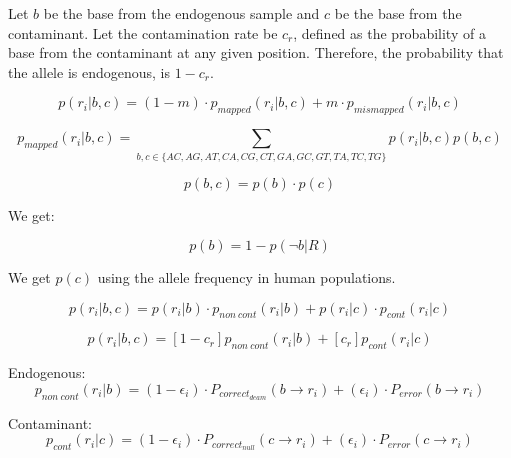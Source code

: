 \documentclass[a4paper,12pt]{article}
\begin{document}
Let $b$ be the base from the endogenous sample and $c$ be the base from the contaminant. Let the contamination rate be $c_r$, defined as the probability of a base from the contaminant at any given position. Therefore, the probability that the allele is endogenous, is $1-c_r$.

\begin{equation}
p(r_i|b,c)  = (1-m) \cdot p_{mapped}(r_i|b,c) + m \cdot p_{mismapped}(r_i|b,c)  %
\end{equation}


\begin{equation}
p_{mapped}(r_i|b,c) = \sum\limits_{ b,c \in \{AC,AG,AT,CA,CG,CT,GA,GC,GT,TA,TC,TG\} } p(r_i|b,c) p(b,c)
\end{equation}

\begin{equation}
p(b,c) = p(b) \cdot p(c)
\end{equation}

\noindent We get:

\begin{equation}
p(b)  = 1 - p(\neg b|R)
\end{equation}

\noindent  We get $p(c)$ using the allele frequency in human populations.

\begin{equation}
p(r_i|b,c)  =  p(r_i|b) \cdot p_{non\ cont}(r_i|b)  +  p(r_i|c) \cdot p_{cont}(r_i|c) 
\end{equation}


\begin{equation}
p(r_i|b,c)  =  [1-c_r]  p_{non\ cont}(r_i|b) +  [c_r] p_{cont}(r_i|c) 
\end{equation}

\noindent Endogenous:
\begin{equation}
p_{non\ cont}(r_i|b) = (1-\epsilon_i ) \cdot  P_{correct_{deam}}( b \to r_i) +  (\epsilon_i) \cdot P_{error}(  b \to r_i )   
\end{equation}

\noindent Contaminant:
\begin{equation}
p_{cont}(r_i|c) = (1-\epsilon_i ) \cdot  P_{correct_{null}}( c \to r_i) +  (\epsilon_i) \cdot P_{error}(  c \to r_i )   
\end{equation}






\clearpage
\end{document}
